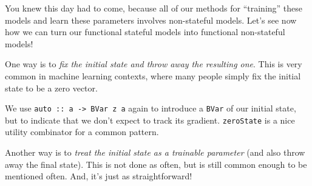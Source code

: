 \documentclass[]{article}
\newenvironment{Shaded}{}{}
\newcommand{\CommentTok}[1]{\textcolor[rgb]{0.38,0.63,0.69}{\textit{#1}}}
\newcommand{\DataTypeTok}[1]{\textcolor[rgb]{0.56,0.13,0.00}{#1}}
\newcommand{\DecValTok}[1]{\textcolor[rgb]{0.25,0.63,0.44}{#1}}
\newcommand{\FunctionTok}[1]{\textcolor[rgb]{0.02,0.16,0.49}{#1}}
\newcommand{\NormalTok}[1]{#1}
\newcommand{\OperatorTok}[1]{\textcolor[rgb]{0.40,0.40,0.40}{#1}}
\newcommand{\OtherTok}[1]{\textcolor[rgb]{0.00,0.44,0.13}{#1}}
\begin{document}
You knew this day had to come, because all of our methods for ``training'' these
models and learn these parameters involves non-stateful models. Let's see now
how we can turn our functional stateful models into functional non-stateful
models!

One way is to \emph{fix the initial state and throw away the resulting one}.
This is very common in machine learning contexts, where many people simply fix
the initial state to be a zero vector.

\begin{Shaded}
\end{Shaded}

We use \texttt{auto\ ::\ a\ -\textgreater{}\ BVar\ z\ a} again to introduce a
\texttt{BVar} of our initial state, but to indicate that we don't expect to
track its gradient. \texttt{zeroState} is a nice utility combinator for a common
pattern.

Another way is to \emph{treat the initial state as a trainable parameter} (and
also throw away the final state). This is not done as often, but is still common
enough to be mentioned often. And, it's just as straightforward!

\begin{Shaded}
\end{Shaded}
\end{document}
